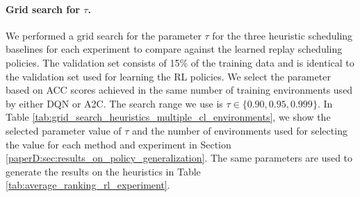 \vspace{-3mm}
\paragraph{Grid search for $\tau$.}
We performed a grid search for the parameter $\tau$ for the three heuristic scheduling baselines for each experiment to compare against the learned replay scheduling policies. The validation set consists of 15\% of the training data and is identical to the validation set used for learning the RL policies. 
We select the parameter based on ACC scores achieved in the same number of training environments used by either DQN or A2C. The search range we use is $\tau \in \{0.90, 0.95, 0.999\}$. In Table \ref{tab:grid_search_heuristics_multiple_cl_environments}, we show the selected parameter value of $\tau$ and the number of environments used for selecting the value for each method and experiment in Section \ref{paperD:sec:results_on_policy_generalization}. %
The same parameters are used to generate the results on the heuristics in Table \ref{tab:average_ranking_rl_experiment}. 


